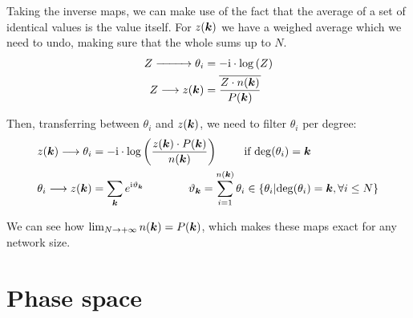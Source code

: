 Taking the inverse maps, we can make use of the fact that the average of a set of identical values is the value itself. For $z({\boldsymbol{k}})$ we have a weighed average which we need to undo, making sure that the whole sums up to $N$.
\begin{align*}
Z \xrightarrow{\hspace*{9mm}} \theta_{i} &= -{\rm{i}} \cdot \log \left( Z \right) \\
Z \longrightarrow z({\boldsymbol{k}}) &= \overline{\frac{Z \cdot n({\boldsymbol{k}})}{P({\boldsymbol{k}})}}
\end{align*}

Then, transferring between $\theta_i$ and $z({\boldsymbol{k}})$, we need to filter $\theta_i$ per degree:
\begin{align*}
z({\boldsymbol{k}}) \longrightarrow \theta_i &= -{\rm{i}} \cdot \log \left( \frac{z({\boldsymbol{k}})\cdot P({\boldsymbol{k}})}{n({\boldsymbol{k}})} \right) \qquad \text{ if } {\rm deg}(\theta_i) = {\boldsymbol{k}} \\
\theta_i \longrightarrow z({\boldsymbol{k}}) &= \sum_{{\boldsymbol{k}}} e^{{\rm{i}} \vartheta_{{\boldsymbol{k}}}} \qquad \qquad \vartheta_{{\boldsymbol{k}}} = \sum_{i = 1}^{n({\boldsymbol{k}})} \theta_i \in 
\left\{ \theta_i \vert {\rm deg}(\theta_i) = {\boldsymbol{k}}, \forall i \leq N \right\}
\end{align*}

We can see how $\lim_{N \rightarrow +\infty} n({\boldsymbol{k}}) = P({\boldsymbol{k}})$, which makes these maps exact for any network size. 
    
\newpage
\section{Phase space}
